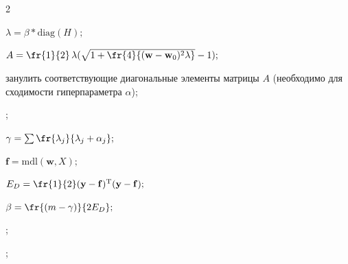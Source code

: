 \begin{multicols}{2}
\begin{algorithmic}
            \STATE$\lambda=\beta*\text{diag}(H);$

            \STATE$A=\fr{1}{2}\,\lambda(\sqrt{1+\fr{4}{(\mathbf{w}-\mathbf{w}_0)^{2}\lambda}}-1);$


                \STATE занулить соответствующие диагональные элементы матрицы $A$ (необходимо для сходимости гиперпараметра $\alpha$);

            \ENDIF

            \EXIT ;

            \STATE$\gamma=\sum \fr{\lambda_j}{\lambda_j + \alpha_j};$

            \STATE$\mathbf{f}=\text{mdl}(\mathbf{w},X);$

            \STATE$E_D=\fr{1}{2}(\mathbf{y}-\mathbf{f})^{\mathrm{T}}(\mathbf{y}-\mathbf{f});$

            \STATE$\beta = \fr{(m - \gamma)}{2 E_D};$



            \ENDIF

            \EXIT ;



            \ENDIF

            \EXIT;

    \ENDFOR



    \ENDIF

\ENDFOR

\OUT

\end{algorithmic}



\vspace*{-12pt}



\begin{algorithmic}



\end{algorithmic}
\end{multicols}

